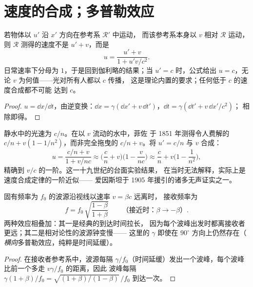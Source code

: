 \section{速度的合成；多普勒效应}

\begin{proposition}[相对论速度合成]\label{prop:b3:relativistic-kinematics:addition}
若物体以 $u'$ 沿 $x'$ 方向在参考系 $\mathcal R'$ 中运动，
而该参考系本身以 $v$ 相对 $\mathcal R$ 运动，
则 $\mathcal R$ 测得的速度不是 $u' + v$，而是
\[
u = \frac{u' + v}{1 + u'v/c^2} .
\]
日常速率下分母为 $1$，于是回到伽利略的结果；当
$u' = c$ 时，公式给出 $u = c$，无论 $v$ 为何值——光对所有人都以 $c$ 传播，
这是理论内置的要求；任何低于 $c$ 的速度合成都不可能
达到 $c$。
\end{proposition}

\begin{proof}
$u = \dd x/\dd t$，由逆变换：$\dd x =
\gamma(\dd x' + v\,\dd t')$，$\dd t = \gamma(\dd t' + v\,\dd x'/c^2)$；
相除即得。
\end{proof}

\begin{example}[菲涅耳系数的解释]\label{ex:b3:relativistic-kinematics:fizeau}
静水中的光速为 $c/n$。在以 $v$ 流动的水中，菲佐
于 1851 年测得令人费解的 $c/n + v(1 - 1/n^2)$，而非完全拖曳的
$c/n + v$。将 $u' = c/n$ 与 $v$ 合成：
\[
u = \frac{c/n + v}{1 + v/nc}
\approx \Big(\frac{c}{n} + v\Big)\Big(1 - \frac{v}{nc}\Big)
\approx \frac{c}{n} + v\Big(1 - \frac{1}{n^2}\Big) ,
\]
精确到 $v/c$ 的一阶。这一十九世纪的台面实验结果，
在当时无法解释，实际上是速度合成定律的一阶近似——
爱因斯坦于 1905 年援引的诸多无声证实之一。
\end{example}

\begin{proposition}[纵向多普勒效应]\label{prop:b3:relativistic-kinematics:doppler}
固有频率为 $f_0$ 的波源沿视线以速率 $v = \beta c$ 远离时，
接收频率为
\[
f = f_0\,\sqrt{\frac{1 - \beta}{1 + \beta}}
\qquad
\text{（接近时：} \beta \to -\beta\text{）} .
\]
两种效应相叠加：其一是经典的到达时间拉长，
因为每个波峰出发时都离接收者更远；其二是相对论性的波源钟变慢——
这里的 $\gamma$ 即使在 $90^\circ$ 方向上仍然存在（
\emph{横向}多普勒效应，纯粹是时间延缓）。
\end{proposition}

\begin{proof}
在接收者参考系中，波源每隔
$\gamma/f_0$（时间延缓）发出一个波峰，每个波峰比前一个多走 $v\gamma/f_0$ 的距离，因此
波峰每隔 $\gamma(1 + \beta)/f_0 = \sqrt{(1+\beta)/
(1-\beta)}\,/f_0$ 到达一次。
\end{proof}

